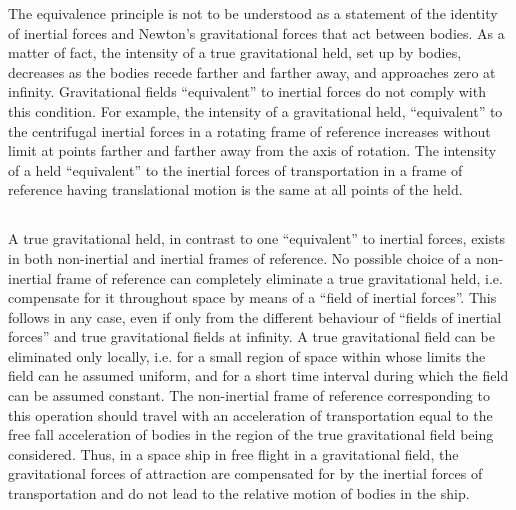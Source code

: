 The equivalence principle is not to be understood as a state­ment of the identity of inertial forces and Newton's gravita­tional forces that act between bodies. As a matter of fact, the intensity of a true gravitational held, set up by bodies, decreases as the bodies recede farther and farther away, and approaches zero at infinity. Gravitational fields ``equivalent'' to iner­tial forces do not comply with this condition. For example, the intensity of a gravitational held, ``equivalent'' to the centri­fugal inertial forces in a rotating frame of reference increases without limit at points farther and farther away from the axis of rotation. The intensity of a held ``equivalent'' to the inertial forces of transportation in a frame of reference having transla­tional motion is the same at all points of the held.

\subsection{}\label{7.4.3} A true gravitational held, in contrast to one ``equivalent'' to inertial forces, exists in both non-inertial and inertial frames of reference. No possible choice of a non-inertial frame of ref­erence can completely eliminate a true gravitational held, i.e. compensate for it throughout space by means of a ``field of inertial forces''. This follows in any case, even if only from the different behaviour of ``fields of inertial forces'' and true gravitational fields at infinity. A true gravitational field can be eliminated only locally, i.e. for a small region of space within whose limits the field can he assumed uniform, and for a short time interval during which the field can be assumed constant. The non-inertial frame of reference corresponding to this operation should travel with an acceleration of transpor­tation equal to the free fall acceleration of bodies in the region of the true gravitational field being considered. Thus, in a space ship in free flight in a gravitational field, the gravitational forces of attraction are compensated for by the inertial forces of transportation and do not lead to the relative motion of bodies in the ship.
